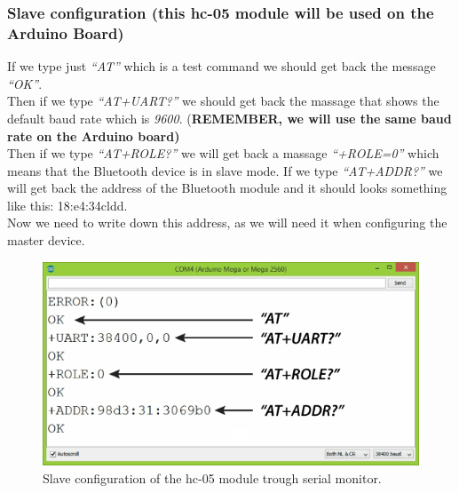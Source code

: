 \subsubsection{Slave configuration (this hc-05 module will be used on the Arduino Board)}
If we type just \textit{“AT”} which is a test command we should get back the message \textit{“OK”}.\\
Then if we type \textit{“AT+UART?”} we should get back the massage that shows the default baud rate which is \textit{9600}. (\textbf{REMEMBER, we will use the same baud rate on the Arduino board)}\\
Then if we type \textit{“AT+ROLE?”} we will get back a massage \textit{“+ROLE=0”} which means that the Bluetooth device is in slave mode. If we type \textit{“AT+ADDR?”} we will get back the address of the Bluetooth module and it should looks something like this: 18:e4:34cldd. \\
Now we need to write down this address, as we will need it when configuring the master device.
\begin{figure}[H]
	\centering
	\includegraphics[width=\textwidth]
	{files/images/hc05_slave2}
	\caption{Slave configuration of the hc-05 module trough serial monitor.}
\end{figure}

